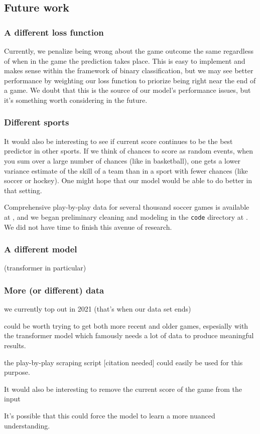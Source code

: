\subsection{Future work}

\subsubsection{A different loss function}

Currently, we penalize being wrong about the game outcome the same regardless of when in the game the prediction takes place. This is easy to implement and makes sense within the framework of binary classification, but we may see better performance by weighting our loss function to priorize being right near the end of a game. We doubt that this is the source of our model's performance issues, but it's something worth considering in the future.

\subsubsection{Different sports}

It would also be interesting to see if current score continues to be the best predictor in other sports. If we think of chances to score as random events, when you sum over a large number of chances (like in basketball), one gets a lower variance estimate of the skill of a team than in a sport with fewer chances (like soccer or hockey). One might hope that our model would be able to do better in that setting.

Comprehensive play-by-play data for several thousand soccer games is available at \cite{statsbomb-open-data}, and we began preliminary cleaning and modeling in the \texttt{code} directory at \cite{stat-comps-github}. We did not have time to finish this avenue of research.

\subsubsection{A different model}

(transformer in particular)

\subsubsection{More (or different) data}

we currently top out in 2021 (that's when our data set ends)

could be worth trying to get both more recent and older games, espesially with the transformer model which famously needs a lot of data to produce meaningful results.

the play-by-play scraping script [citation needed] could easily be used for this purpose.

It would also be interesting to remove the current score of the game from the input

It's possible that this could force the model to learn a more nuanced understanding.
